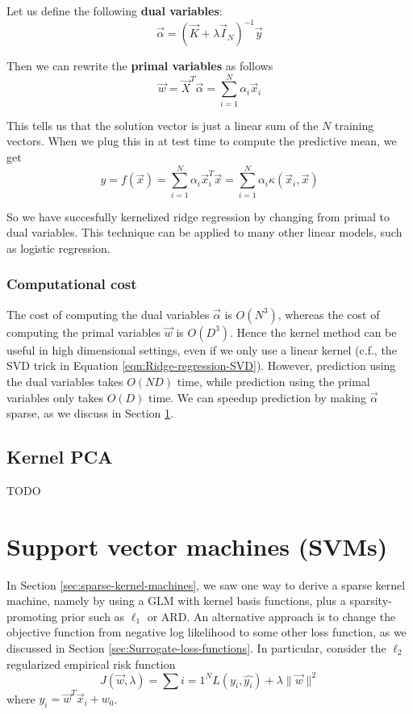 Let us define the following \textbf{dual variables}:
\begin{equation}
\vec{\alpha}=(\vec{K}+\lambda\vec{I}_N)^{-1}\vec{y}
\end{equation}

Then we can rewrite the \textbf{primal variables} as follows
\begin{equation}
\vec{w}=\vec{X}^T\vec{\alpha}=\sum\limits_{i=1}^N \alpha_i\vec{x}_i
\end{equation}

This tells us that the solution vector is just a linear sum of the $N$ training vectors. When we plug this in at test time to compute the predictive mean, we get
\begin{equation}
y=f(\vec{x})=\sum\limits_{i=1}^N \alpha_i\vec{x}_i^T\vec{x}=\sum\limits_{i=1}^N \alpha_i\kappa(\vec{x}_i,\vec{x})
\end{equation}

So we have succesfully kernelized ridge regression by changing from primal to dual variables. This technique can be applied to many other linear models, such as logistic regression.


\subsubsection{Computational cost}
The cost of computing the dual variables $\vec{\alpha}$ is $O(N^3)$, whereas the cost of computing the primal variables $\vec{w}$ is $O(D^3)$. Hence the kernel method can be useful in high dimensional settings, even if we only use a linear kernel (c.f., the SVD trick in Equation \ref{eqn:Ridge-regression-SVD}). However, prediction using the dual variables takes $O(ND)$ time, while prediction using the primal variables only takes $O(D)$ time. We can speedup prediction by making $\vec{\alpha}$ sparse, as we discuss in Section \ref{sec:SVMs}.


\subsection{Kernel PCA}
TODO


\section{Support vector machines (SVMs)}
\label{sec:SVMs}
In Section \ref{sec:sparse-kernel-machines}, we saw one way to derive a sparse kernel machine, namely by using a GLM with kernel basis functions, plus a sparsity-promoting prior such as $\ell_1$ or ARD. An alternative approach is to change the objective function from negative log likelihood to some other loss function, as we discussed in Section \ref{sec:Surrogate-loss-functions}. In particular, consider the $\ell_2$ regularized empirical risk function
\begin{equation}
J(\vec{w}, \lambda)=\sum\limits{i=1}^N L(y_i, \hat{y_i})+\lambda\lVert\vec{w}\rVert^2
\end{equation}
where $\hat{y_i}=\vec{w}^T\vec{x}_i+w_0$.


